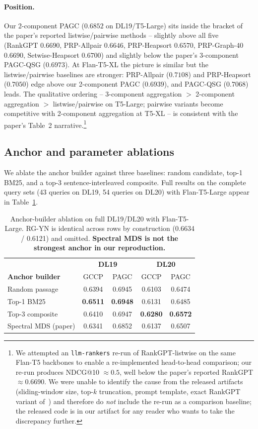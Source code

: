 \documentclass[sigconf]{acmart}
\begin{document}
\paragraph{Position.} Our 2-component PAGC ($0.6852$ on DL19/T5-Large)
sits inside the bracket of the paper's reported listwise/pairwise
methods -- slightly above all five (RankGPT $0.6690$,
PRP-Allpair $0.6646$, PRP-Heapsort $0.6570$, PRP-Graph-40 $0.6690$,
Setwise-Heapsort $0.6700$) and slightly below the paper's
3-component PAGC-QSG ($0.6973$). At Flan-T5-XL the picture is
similar but the listwise/pairwise baselines are stronger:
PRP-Allpair ($0.7108$) and PRP-Heapsort ($0.7050$) edge above our
2-component PAGC ($0.6939$), and PAGC-QSG ($0.7068$) leads. The
qualitative ordering -- 3-component aggregation $>$ 2-component
aggregation $>$ listwise/pairwise on T5-Large; pairwise variants
become competitive with 2-component aggregation at T5-XL -- is
consistent with the paper's Table~2 narrative.\footnote{We
attempted an \texttt{llm-rankers} re-run of RankGPT-listwise on
the same Flan-T5 backbones to enable a re-implemented head-to-head
comparison; our re-run produces NDCG@10 $\approx 0.5$, well below
the paper's reported RankGPT $\approx 0.6690$. We were unable to
identify the cause from the released artifacts (sliding-window
size, top-$k$ truncation, prompt template, exact RankGPT variant
of~\cite{sun2023chatgpt}) and therefore do \emph{not} include the
re-run as a comparison baseline; the released code is in our
artifact for any reader who wants to take the discrepancy further.}

\subsection{Anchor and parameter ablations}
\label{sec:anchor-ablation}
We ablate the anchor builder against three baselines: random
candidate, top-1 BM25, and a top-3 sentence-interleaved composite.
Full results on the complete query sets (43 queries on DL19,
54 queries on DL20) with Flan-T5-Large appear in
Table~\ref{tab:anchor-full}.

\begin{table}[t]
\centering
\small
\begin{tabular}{lcc|cc}
\toprule
& \multicolumn{2}{c}{\textbf{DL19}} & \multicolumn{2}{c}{\textbf{DL20}} \\
\textbf{Anchor builder} & GCCP & PAGC & GCCP & PAGC \\
\midrule
Random passage   & 0.6394 & 0.6945 & 0.6103 & 0.6474 \\
Top-1 BM25       & \textbf{0.6511} & \textbf{0.6948} & 0.6131 & 0.6485 \\
Top-3 composite  & 0.6410 & 0.6947 & \textbf{0.6280} & \textbf{0.6572} \\
Spectral MDS (paper) & 0.6341 & 0.6852 & 0.6137 & 0.6507 \\
\bottomrule
\end{tabular}
\caption{Anchor-builder ablation on full DL19/DL20 with
Flan-T5-Large. RG-YN is identical across rows by construction
(0.6634 / 0.6121) and omitted. \textbf{Spectral MDS is not the
strongest anchor in our reproduction.}}
\label{tab:anchor-full}
\end{table}
\end{document}
